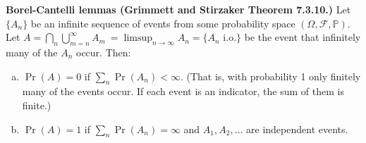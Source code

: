 \begin{theorem}\textbf{Borel-Cantelli lemmas (Grimmett and Stirzaker Theorem 7.3.10.)} \label{asym.borel} Let \(\{A_n\}\) be an infinite sequence of events from some probability space \((\Omega, \mathcal{F}, \mathbb{P})\). Let \(A = \bigcap_n \bigcup_{m=n}^\infty A_m\ = \limsup_{n \to \infty} A_n = \{A_n \text{ i.o.}\}\) be the event that infinitely many of the \(A_n\) occur. Then:

\begin{enumerate}[(a)]

\item \(\Pr(A) = 0 \) if \(\sum_n \Pr(A_n) < \infty\). (That is, with probability 1 only finitely many of the events occur. If each event is an indicator, the sum of them is finite.)

\item \(\Pr(A) = 1\) if \(\sum_n \Pr(A_n) = \infty\) and \(A_1, A_2, \ldots\) are independent events.

\end{enumerate}
\end{theorem}

